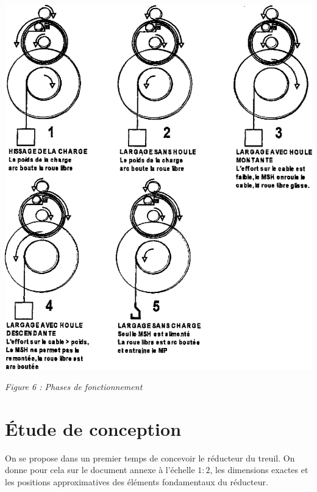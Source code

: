 \documentclass[10pt]{article}
\begin{document}
\begin{minipage}[c]{.49\linewidth}
\begin{center}
\includegraphics[width=\textwidth]{images/Treuil_02}

\textit{Figure 6 : Phases de fonctionnement}
\end{center}
\end{minipage} 


\section{Étude de conception}

On se propose dans un premier temps de concevoir le réducteur du treuil. On donne pour cela sur le document annexe à l'échelle $1:2$, les dimensions exactes et les positions approximatives des éléments fondamentaux du réducteur. 
\end{document}
